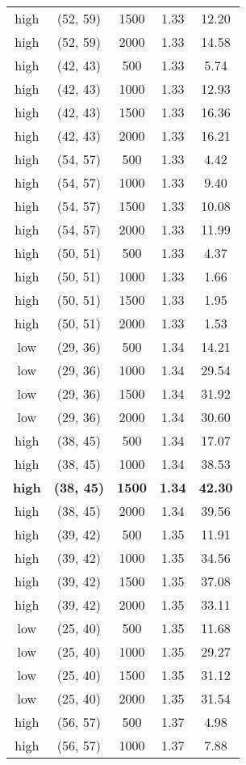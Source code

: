 \begin{tabular}{c c c c c}
high & (52, 59) &  1500 & 1.33 & 12.20 \\
high & (52, 59) &  2000 & 1.33 & 14.58 \\
high & (42, 43) &  500 & 1.33 & 5.74 \\
high & (42, 43) &  1000 & 1.33 & 12.93 \\
high & (42, 43) &  1500 & 1.33 & 16.36 \\
high & (42, 43) &  2000 & 1.33 & 16.21 \\
high & (54, 57) &  500 & 1.33 & 4.42 \\
high & (54, 57) &  1000 & 1.33 & 9.40 \\
high & (54, 57) &  1500 & 1.33 & 10.08 \\
high & (54, 57) &  2000 & 1.33 & 11.99 \\
high & (50, 51) &  500 & 1.33 & 4.37 \\
high & (50, 51) &  1000 & 1.33 & 1.66 \\
high & (50, 51) &  1500 & 1.33 & 1.95 \\
high & (50, 51) &  2000 & 1.33 & 1.53 \\
low & (29, 36) &  500 & 1.34 & 14.21 \\
low & (29, 36) &  1000 & 1.34 & 29.54 \\
low & (29, 36) &  1500 & 1.34 & 31.92 \\
low & (29, 36) &  2000 & 1.34 & 30.60 \\
high & (38, 45) &  500 & 1.34 & 17.07 \\
high & (38, 45) &  1000 & 1.34 & 38.53 \\
\textbf{high} & \textbf{(38, 45)} & \textbf{ 1500} & \textbf{1.34} & \textbf{42.30} \\
high & (38, 45) &  2000 & 1.34 & 39.56 \\
high & (39, 42) &  500 & 1.35 & 11.91 \\
high & (39, 42) &  1000 & 1.35 & 34.56 \\
high & (39, 42) &  1500 & 1.35 & 37.08 \\
high & (39, 42) &  2000 & 1.35 & 33.11 \\
low & (25, 40) &  500 & 1.35 & 11.68 \\
low & (25, 40) &  1000 & 1.35 & 29.27 \\
low & (25, 40) &  1500 & 1.35 & 31.12 \\
low & (25, 40) &  2000 & 1.35 & 31.54 \\
high & (56, 57) &  500 & 1.37 & 4.98 \\
high & (56, 57) &  1000 & 1.37 & 7.88 \\

\end{tabular}
